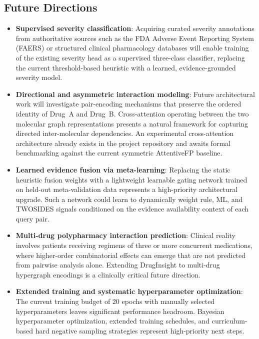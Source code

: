 \documentclass[conference]{IEEEtran}
\begin{document}
\subsection{Future Directions}
\begin{itemize}
    \item \textbf{Supervised severity classification}: Acquiring curated severity annotations from authoritative sources such as the FDA Adverse Event Reporting System (FAERS) or structured clinical pharmacology databases will enable training of the existing severity head as a supervised three-class classifier, replacing the current threshold-based heuristic with a learned, evidence-grounded severity model.

    \item \textbf{Directional and asymmetric interaction modeling}: Future architectural work will investigate pair-encoding mechanisms that preserve the ordered identity of Drug~A and Drug~B. Cross-attention operating between the two molecular graph representations presents a natural framework for capturing directed inter-molecular dependencies. An experimental cross-attention architecture already exists in the project repository and awaits formal benchmarking against the current symmetric AttentiveFP baseline.

    \item \textbf{Learned evidence fusion via meta-learning}: Replacing the static heuristic fusion weights with a lightweight learnable gating network trained on held-out meta-validation data represents a high-priority architectural upgrade. Such a network could learn to dynamically weight rule, ML, and TWOSIDES signals conditioned on the evidence availability context of each query pair.

    \item \textbf{Multi-drug polypharmacy interaction prediction}: Clinical reality involves patients receiving regimens of three or more concurrent medications, where higher-order combinatorial effects can emerge that are not predicted from pairwise analysis alone. Extending DrugInsight to multi-drug hypergraph encodings is a clinically critical future direction.

    \item \textbf{Extended training and systematic hyperparameter optimization}: The current training budget of 20 epochs with manually selected hyperparameters leaves significant performance headroom. Bayesian hyperparameter optimization, extended training schedules, and curriculum-based hard negative sampling strategies represent high-priority next steps.


\end{itemize}
\end{document}
